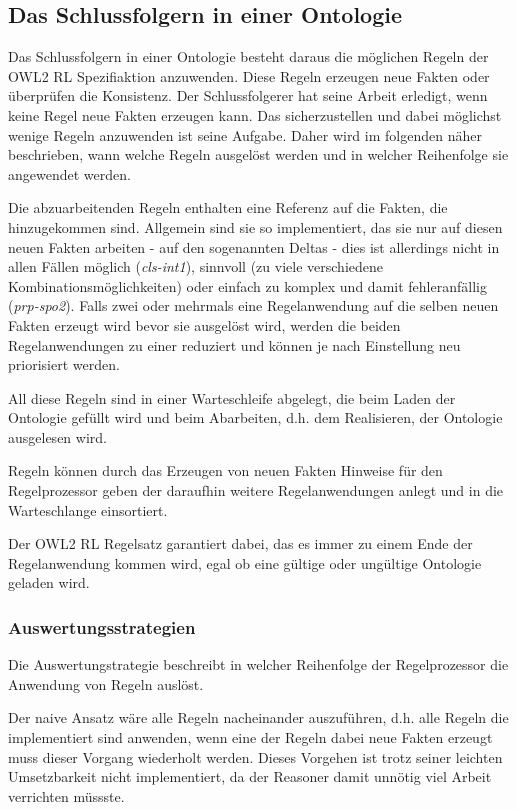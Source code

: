 \subsection{Das Schlussfolgern in einer Ontologie}
Das Schlussfolgern in einer Ontologie besteht daraus die möglichen Regeln der OWL2 RL Spezifiaktion anzuwenden. Diese Regeln erzeugen neue Fakten oder überprüfen die Konsistenz. Der Schlussfolgerer hat seine Arbeit erledigt, wenn keine Regel neue Fakten erzeugen kann. Das sicherzustellen und dabei möglichst wenige Regeln anzuwenden ist seine Aufgabe. Daher wird im folgenden näher beschrieben, wann welche Regeln ausgelöst werden und in welcher Reihenfolge sie angewendet werden.

Die abzuarbeitenden Regeln enthalten eine Referenz auf die Fakten, die hinzugekommen sind. Allgemein sind sie so implementiert, das sie nur auf diesen neuen Fakten arbeiten -  auf den sogenannten Deltas - dies ist allerdings nicht in allen Fällen möglich (\emph{cls-int1}), sinnvoll (zu viele verschiedene Kombinationsmöglichkeiten) oder einfach zu komplex und damit fehleranfällig (\emph{prp-spo2}). Falls zwei oder mehrmals eine Regelanwendung auf die selben neuen Fakten erzeugt wird bevor sie ausgelöst wird, werden die beiden Regelanwendungen zu einer reduziert und können je nach Einstellung neu priorisiert werden.

All diese Regeln sind in einer Warteschleife abgelegt, die beim Laden der Ontologie gefüllt wird und beim Abarbeiten, d.h. dem Realisieren, der Ontologie ausgelesen wird.

Regeln können durch das Erzeugen von neuen Fakten Hinweise für den Regelprozessor geben der daraufhin weitere Regelanwendungen anlegt und in die Warteschlange einsortiert.

Der OWL2 RL Regelsatz garantiert dabei, das es immer zu einem Ende der Regelanwendung kommen wird, egal ob eine gültige oder ungültige Ontologie geladen wird.

\subsubsection{Auswertungsstrategien}
Die Auswertungstrategie beschreibt in welcher Reihenfolge der Regelprozessor die Anwendung von Regeln auslöst. 

Der naive Ansatz wäre alle Regeln nacheinander auszuführen, d.h. alle Regeln die implementiert sind anwenden, wenn eine der Regeln dabei neue Fakten erzeugt muss dieser Vorgang wiederholt werden. Dieses Vorgehen ist trotz seiner leichten Umsetzbarkeit nicht implementiert, da der Reasoner damit unnötig viel Arbeit verrichten müssste.

